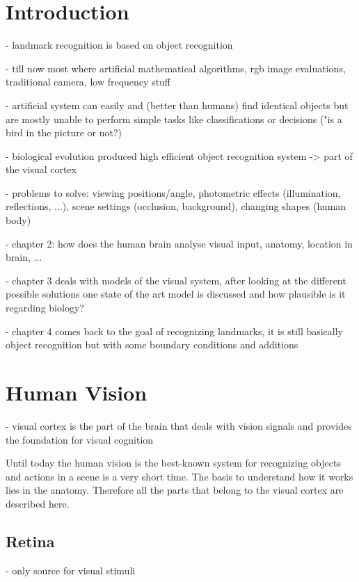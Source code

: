 
\chapter{Introduction}
	
	- landmark recognition is based on object recognition
	
	- till now most where artificial mathematical algorithms, rgb image evaluations, traditional camera, low frequency stuff
	
	- artificial system can easily and (better than humans) find identical objects but are mostly unable to perform simple tasks like classifications or decisions ("is a bird in the picture or not?)
	
	- biological evolution produced high efficient object recognition system -> part of the visual cortex
	
	- problems to solve: viewing positions/angle, photometric effects (illumination, reflections, ...), scene settings (occlusion, background), changing shapes (human body)
	
	- chapter 2: how does the human brain analyse visual input, anatomy, location in brain, ...
	
	- chapter 3 deals with models of the visual system, after looking at the different possible solutions one state of the art model is discussed and how plausible is it regarding biology?
	
	- chapter 4 comes back to the goal of recognizing landmarks, it is still basically object recognition but with some boundary conditions and additions
	
	
\chapter{Human Vision}

	- visual cortex is the part of the brain that deals with vision signals and provides the foundation for visual cognition
	
	Until today the human vision is the best-known system for  recognizing objects and actions in a scene is a very short time. The basis to understand how it works lies in the anatomy. Therefore all the parts that belong to the visual cortex are described here.
	
	\section{Retina}

		- only source for visual stimuli
		

